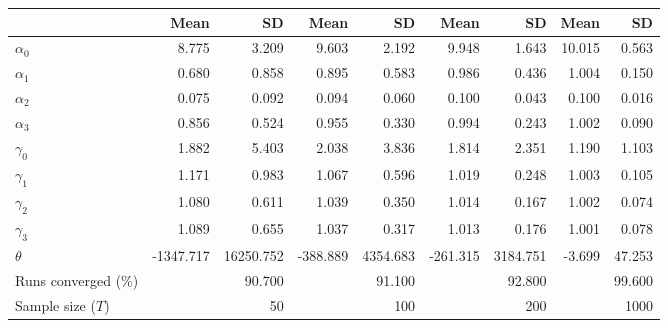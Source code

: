 
\begin{tabular}[t]{lrrrrrrrr}
\toprule
  & Mean & SD & Mean  & SD  & Mean   & SD   & Mean    & SD   \\
\midrule
$\alpha_{0}$ & 8.775 & 3.209 & 9.603 & 2.192 & 9.948 & 1.643 & 10.015 & 0.563\\
$\alpha_{1}$ & 0.680 & 0.858 & 0.895 & 0.583 & 0.986 & 0.436 & 1.004 & 0.150\\
$\alpha_{2}$ & 0.075 & 0.092 & 0.094 & 0.060 & 0.100 & 0.043 & 0.100 & 0.016\\
$\alpha_{3}$ & 0.856 & 0.524 & 0.955 & 0.330 & 0.994 & 0.243 & 1.002 & 0.090\\
$\gamma_{0}$ & 1.882 & 5.403 & 2.038 & 3.836 & 1.814 & 2.351 & 1.190 & 1.103\\
$\gamma_{1}$ & 1.171 & 0.983 & 1.067 & 0.596 & 1.019 & 0.248 & 1.003 & 0.105\\
$\gamma_{2}$ & 1.080 & 0.611 & 1.039 & 0.350 & 1.014 & 0.167 & 1.002 & 0.074\\
$\gamma_{3}$ & 1.089 & 0.655 & 1.037 & 0.317 & 1.013 & 0.176 & 1.001 & 0.078\\
$\theta$ & -1347.717 & 16250.752 & -388.889 & 4354.683 & -261.315 & 3184.751 & -3.699 & 47.253\\
Runs converged (\%) &  & 90.700 &  & 91.100 &  & 92.800 &  & 99.600\\
Sample size ($T$) &  & 50 &  & 100 &  & 200 &  & 1000\\
\bottomrule
\end{tabular}
